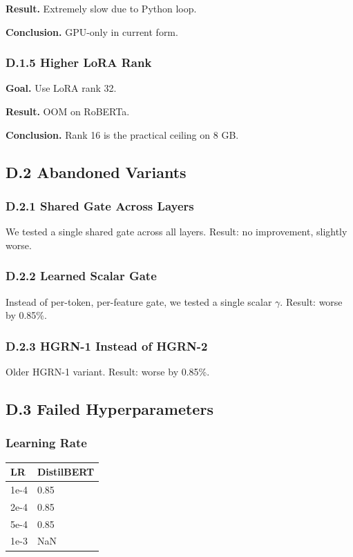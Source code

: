 \textbf{Result.} Extremely slow due to Python loop.

\textbf{Conclusion.} GPU-only in current form.

\subsubsection{D.1.5 Higher LoRA Rank}

\textbf{Goal.} Use LoRA rank 32.

\textbf{Result.} OOM on RoBERTa.

\textbf{Conclusion.} Rank 16 is the practical ceiling on 8 GB.

\subsection{D.2 Abandoned Variants}

\subsubsection{D.2.1 Shared Gate Across Layers}

We tested a single shared gate across all layers. Result: no improvement, 
slightly worse.

\subsubsection{D.2.2 Learned Scalar Gate}

Instead of per-token, per-feature gate, we tested a single scalar $\gamma$. Result: 
worse by 0.85\%.

\subsubsection{D.2.3 HGRN-1 Instead of HGRN-2}

Older HGRN-1 variant. Result: worse by 0.85\%.

\subsection{D.3 Failed Hyperparameters}

\subsubsection{Learning Rate}

\begin{table}[H]
\centering
\small
\begin{tabular}{ll}
\toprule
\textbf{LR} & \textbf{DistilBERT} \\
\midrule
1e-4 & 0.85 \\
2e-4 & 0.85 \\
5e-4 & 0.85 \\
1e-3 & NaN \\
\bottomrule
\end{tabular}
\end{table}

